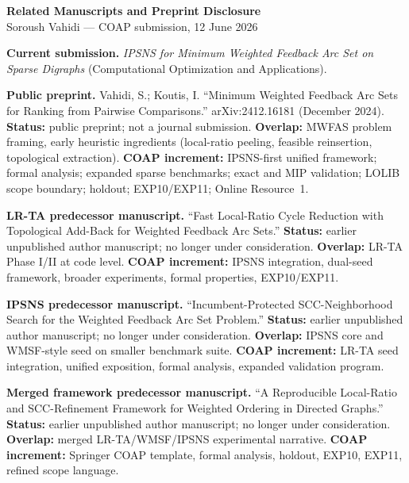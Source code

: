 \documentclass[11pt]{article}
\begin{document}
\begin{center}
{\large\bfseries Related Manuscripts and Preprint Disclosure}\\[0.4em]
{\normalsize Soroush Vahidi --- COAP submission, 12 June 2026}
\end{center}

\vspace{0.5em}
\noindent
\textbf{Current submission.} \textit{IPSNS for Minimum Weighted Feedback Arc Set on Sparse Digraphs} (Computational Optimization and Applications).

\vspace{0.5em}
\noindent
\textbf{Public preprint.} Vahidi, S.; Koutis, I. ``Minimum Weighted Feedback Arc Sets for Ranking from Pairwise Comparisons.'' arXiv:2412.16181 (December 2024). \textbf{Status:} public preprint; not a journal submission. \textbf{Overlap:} MWFAS problem framing, early heuristic ingredients (local-ratio peeling, feasible reinsertion, topological extraction). \textbf{COAP increment:} IPSNS-first unified framework; formal analysis; expanded sparse benchmarks; exact and MIP validation; LOLIB scope boundary; holdout; EXP10/EXP11; Online Resource~1.

\vspace{0.5em}
\noindent
\textbf{LR-TA predecessor manuscript.} ``Fast Local-Ratio Cycle Reduction with Topological Add-Back for Weighted Feedback Arc Sets.'' \textbf{Status:} earlier unpublished author manuscript; no longer under consideration. \textbf{Overlap:} LR-TA Phase I/II at code level. \textbf{COAP increment:} IPSNS integration, dual-seed framework, broader experiments, formal properties, EXP10/EXP11.

\vspace{0.5em}
\noindent
\textbf{IPSNS predecessor manuscript.} ``Incumbent-Protected SCC-Neighborhood Search for the Weighted Feedback Arc Set Problem.'' \textbf{Status:} earlier unpublished author manuscript; no longer under consideration. \textbf{Overlap:} IPSNS core and WMSF-style seed on smaller benchmark suite. \textbf{COAP increment:} LR-TA seed integration, unified exposition, formal analysis, expanded validation program.

\vspace{0.5em}
\noindent
\textbf{Merged framework predecessor manuscript.} ``A Reproducible Local-Ratio and SCC-Refinement Framework for Weighted Ordering in Directed Graphs.'' \textbf{Status:} earlier unpublished author manuscript; no longer under consideration. \textbf{Overlap:} merged LR-TA/WMSF/IPSNS experimental narrative. \textbf{COAP increment:} Springer COAP template, formal analysis, holdout, EXP10, EXP11, refined scope language.
\end{document}

